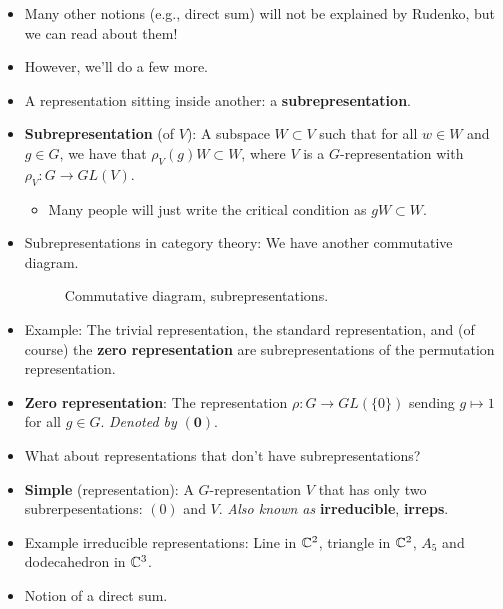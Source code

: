 \documentclass[../notes.tex]{subfiles}
\begin{document}
\begin{itemize}
    \item Many other notions (e.g., direct sum) will not be explained by Rudenko, but we can read about them!
    \item However, we'll do a few more.
    \item A representation sitting inside another: a \textbf{subrepresentation}.
    \item \textbf{Subrepresentation} (of $V$): A subspace $W\subset V$ such that for all $w\in W$ and $g\in G$, we have that $\rho_V(g)W\subset W$, where $V$ is a $G$-representation with $\rho_V:G\to GL(V)$.
    \begin{itemize}
        \item Many people will just write the critical condition as $gW\subset W$.
    \end{itemize}
    \item Subrepresentations in category theory: We have another commutative diagram.
    \begin{figure}[h!]
        \centering
        \DisableQuotes
        \EnableQuotes
        \vspace{-1.5em}
        \caption{Commutative diagram, subrepresentations.}
        \label{fig:CDsubreps}
    \end{figure}
    \item Example: The trivial representation, the standard representation, and (of course) the \textbf{zero representation} are subrepresentations of the permutation representation.
    \item \textbf{Zero representation}: The representation $\rho:G\to GL(\{0\})$ sending $g\mapsto 1$ for all $g\in G$. \emph{Denoted by} $\bm{(0)}$.
    \item What about representations that don't have subrepresentations?
    \item \textbf{Simple} (representation): A $G$-representation $V$ that has only two subrerpesentations: $(0)$ and $V$. \emph{Also known as} \textbf{irreducible}, \textbf{irreps}.
    \item Example irreducible representations: Line in $\mathbb{C}^2$, triangle in $\mathbb{C}^2$, $A_5$ and dodecahedron in $\mathbb{C}^3$.
    \item Notion of a direct sum.

\end{itemize}
\end{document}
